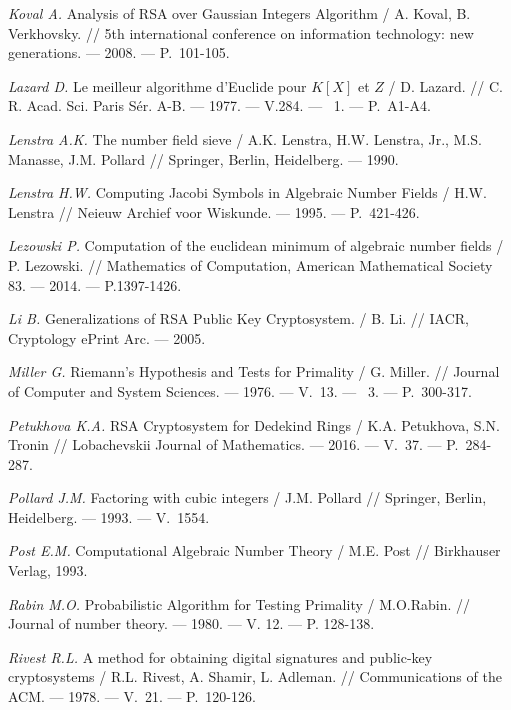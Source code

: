 \begin{thebibliography}{99}
    \textit{Koval A.} Analysis of RSA over Gaussian Integers Algorithm / A. Koval, B. Verkhovsky. // 5th international conference on information technology: new generations. --- 2008. --- {P.}~101-105.
    
    \textit{Lazard D.} Le meilleur algorithme d'{E}uclide pour {$K[X]$} et {$Z$} / D. Lazard. // C. R. Acad. Sci. Paris S\'er. A-B. --- 1977. --- V.284. --- \textnumero~1. --- P.~A1-A4.
    
    \textit{Lenstra A.K.} The number field sieve / A.K. Lenstra, H.W. Lenstra, Jr., M.S. Manasse, J.M. Pollard // Springer, Berlin, Heidelberg. --- 1990.

    \textit{Lenstra H.W.} Computing Jacobi Symbols in Algebraic Number Fields / H.W. Lenstra // Neieuw Archief voor Wiskunde. --- 1995. --- P.~421-426.

    \textit{Lezowski P.} Computation of the euclidean minimum of algebraic number fields / P. Lezowski. // Mathematics of Computation, American Mathematical Society 83. --- 2014. --- P.1397-1426.

    \textit{Li B.} Generalizations of RSA Public Key Cryptosystem. / B. Li. // IACR, Cryptology ePrint Arc. --- 2005.

    \textit{Miller G.} Riemann's Hypothesis and Tests for Primality / G. Miller. // Journal of Computer and System Sciences. --- 1976. --- V.~13. --- ~3. --- {P.}~300-317.
    
    \textit{Petukhova K.A.} RSA Cryptosystem for Dedekind Rings / K.A. Petukhova, S.N. Tronin // Lobachevskii Journal of Mathematics. --- 2016. --- V.~37. --- P.~284-287.
    
    \textit{Pollard J.M.} Factoring with cubic integers / J.M. Pollard // Springer, Berlin, Heidelberg. --- 1993. --- V.~1554.

    \textit{Post E.M.} Computational Algebraic Number Theory / M.E. Post // Birkhauser Verlag, 1993.

    \textit{Rabin M.O.} Probabilistic Algorithm for Testing Primality / M.O.Rabin. // Journal of number theory. --- 1980. --- V. 12. --- P. 128-138.
    
    \textit{Rivest R.L.} A method for obtaining digital signatures and public-key cryptosystems / R.L. Rivest, A. Shamir, L. Adleman. // Communications of the ACM. --- 1978. --- V.~21. --- P.~120-126.
    

\end{thebibliography}
